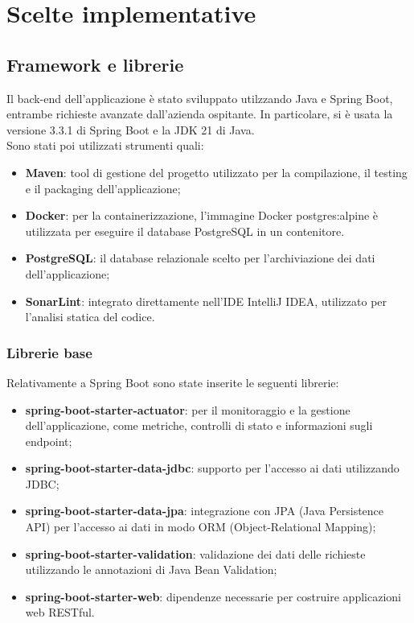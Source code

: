 \section{Scelte implementative}

\subsection{Framework e librerie}
Il back-end dell'applicazione è stato sviluppato utilzzando Java e Spring Boot, entrambe richieste avanzate dall'azienda ospitante.
In particolare, si è usata la versione 3.3.1 di Spring Boot e la JDK 21 di Java. \\
Sono stati poi utilizzati strumenti quali:
\begin{itemize}
    \item \textbf{Maven}: tool di gestione del progetto utilizzato per la compilazione, il testing e il packaging dell'applicazione;
    \item \textbf{Docker}: per la containerizzazione, l'immagine Docker postgres:alpine è utilizzata per eseguire il database PostgreSQL in un contenitore.
    \item \textbf{PostgreSQL}: il database relazionale scelto per l'archiviazione dei dati dell'applicazione;
    \item \textbf{SonarLint}: integrato direttamente nell'IDE IntelliJ IDEA, utilizzato per l'analisi statica del codice.
\end{itemize}

\subsubsection*{Librerie base}
Relativamente a Spring Boot sono state inserite le seguenti librerie:
\begin{itemize}
    \item \textbf{spring-boot-starter-actuator}: per il monitoraggio e la gestione dell'applicazione, come metriche, controlli di stato e informazioni sugli endpoint;
    \item \textbf{spring-boot-starter-data-jdbc}: supporto per l'accesso ai dati utilizzando JDBC;
    \item \textbf{spring-boot-starter-data-jpa}: integrazione con JPA (Java Persistence API) per l'accesso ai dati in modo ORM (Object-Relational Mapping);
    \item \textbf{spring-boot-starter-validation}: validazione dei dati delle richieste utilizzando le annotazioni di Java Bean Validation;
    \item \textbf{spring-boot-starter-web}: dipendenze necessarie per costruire applicazioni web RESTful.
\end{itemize}


